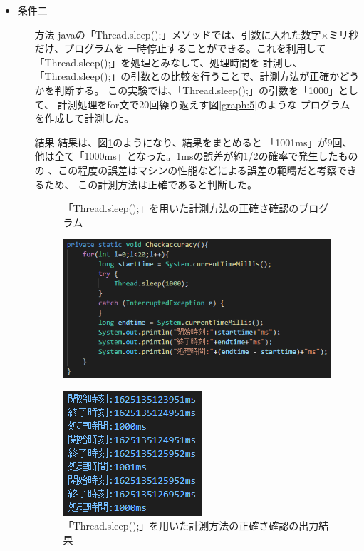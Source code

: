 \begin{enumerate}
\begin{itemize}
\begin{itemize}
\begin{figure}[htbp]
\begin{minipage}[t]{0.45\hsize}
        \end{minipage}
      \end{figure}
    \end{itemize}
    \clearpage
    \item 条件二
    \begin{itemize}
      \item[方法] javaの「Thread.sleep();」メソッドでは、引数に入れた数字×ミリ秒だけ、プログラムを
      一時停止することができる。これを利用して「Thread.sleep();」を処理とみなして、処理時間を
      計測し、「Thread.sleep();」の引数との比較を行うことで、計測方法が正確かどうかを判断する。
      この実験では、「Thread.sleep();」の引数を「1000」として、
      計測処理をfor文で20回繰り返えす図\ref{graph:5}のような
      プログラムを作成して計測した。
      
      \item[結果] 結果は、図\ref{graph:6}のようになり、結果をまとめると
      「1001ms」が9回、他は全て「1000ms」となった。1msの誤差が約1/2の確率で発生したものの
      、この程度の誤差はマシンの性能などによる誤差の範疇だと考察できるため、
      この計測方法は正確であると判断した。
      \begin{figure}[htbp]
        \begin{minipage}[t]{0.5\hsize}
          \centering
          \caption{「Thread.sleep();」を用いた計測方法の正確さ確認のプログラム}
          \label{graph:5}
          \includegraphics[scale=0.75]{計測方法の正確さを確認.PNG}
        \end{minipage}
        \begin{minipage}[t]{0.45\hsize}
          \centering
          \caption{「Thread.sleep();」を用いた計測方法の正確さ確認の出力結果}
          \label{graph:6}
          \includegraphics[scale=0.9]{計測方法の正確さを確認の出力.PNG}

\end{minipage}
\end{figure}
\end{itemize}
\end{itemize}
\end{enumerate}
